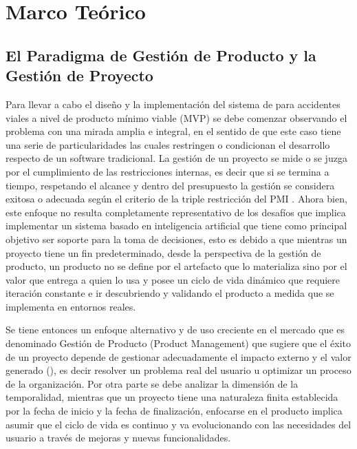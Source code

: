 \chapter{Marco Teórico}\label{marco-teorico}

\section{El Paradigma de Gestión de Producto y la Gestión de Proyecto}\label{el-paradigma-de-gestiuxf3n-de-producto-y-la-gestiuxf3n-de-proyecto}

Para llevar a cabo el diseño y la implementación del sistema de  para accidentes viales a nivel de producto mínimo viable (MVP) se debe comenzar observando el problema con una mirada amplia e integral, en el sentido de que este caso tiene una serie de particularidades las cuales restringen o condicionan el desarrollo respecto de un software tradicional. La gestión de un proyecto se mide o se juzga por el cumplimiento de las restricciones internas, es decir que si se termina a tiempo, respetando el alcance y dentro del presupuesto la gestión se considera exitosa o adecuada según el criterio de la triple restricción del PMI \autocite{pmi2021}. Ahora bien, este enfoque no resulta completamente representativo de los desafíos que implica implementar un sistema basado en inteligencia artificial que tiene como principal objetivo ser soporte para la toma de decisiones, esto es debido a que mientras un proyecto tiene un fin predeterminado, desde la perspectiva de la gestión de producto, un producto no se define por el artefacto que lo materializa sino por el valor que entrega a quien lo usa y posee un ciclo de vida dinámico que requiere iteración constante  \autocite{cagan2018} e ir descubriendo y validando el producto a medida que se implementa en entornos reales.

Se tiene entonces un enfoque alternativo y de uso creciente en el mercado que es denominado Gestión de Producto (Product Management) que sugiere que el éxito de un proyecto depende de gestionar adecuadamente el impacto externo y el valor generado (), es decir resolver un problema real del usuario u optimizar un proceso de la organización. Por otra parte se debe analizar la dimensión de la temporalidad, mientras que un proyecto tiene una naturaleza finita establecida por la fecha de inicio y la fecha de finalización, enfocarse en el producto implica asumir que el ciclo de vida es continuo y va evolucionando con las necesidades del usuario a través de mejoras y nuevas funcionalidades.

